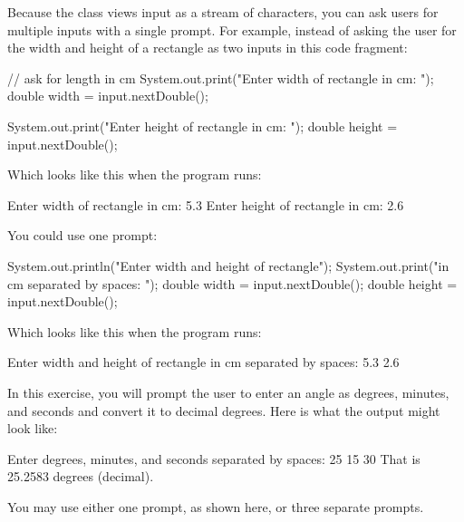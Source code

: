 \begin{exercise}
\label{ex.degrees}
Because the  class views input as a stream of characters, you can ask users for multiple inputs with a single prompt. For example, instead of asking the user for the width and height of a rectangle as two inputs in this code fragment:

\begin{code}
// ask for length in cm
System.out.print("Enter width of rectangle in cm: ");
double width = input.nextDouble();
        
System.out.print("Enter height of rectangle in cm: ");
double height = input.nextDouble();
\end{code}

Which looks like this when the program runs:

\begin{stdout}
Enter width of rectangle in cm: 5.3
Enter height of rectangle in cm: 2.6
\end{stdout}

You could use one prompt:

\begin{code}
System.out.println("Enter width and height of rectangle");
System.out.print("in cm separated by spaces: ");
double width = input.nextDouble();
double height = input.nextDouble();
\end{code}

Which looks like this when the program runs:

\begin{stdout}
Enter width and height of rectangle
in cm separated by spaces: 5.3 2.6
\end{stdout}

In this exercise, you will prompt the user to enter an angle as degrees, minutes, and seconds and convert it to decimal degrees. Here is what the output might look like:

\begin{stdout}
Enter degrees, minutes, and seconds
separated by spaces: 25 15 30
That is 25.2583 degrees (decimal).
\end{stdout}

You may use either one prompt, as shown here, or three separate prompts.

\end{exercise}


